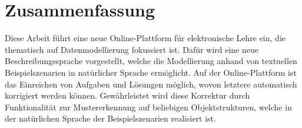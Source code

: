 \chapter*{Zusammenfassung}


Diese Arbeit führt eine neue Online-Plattform für elektronische Lehre ein, die thematisch auf Datenmodellierung fokussiert ist.
Dafür wird eine neue Beschreibungssprache vorgestellt, welche die Modellierung anhand von textuellen Beispielszenarien in natürlicher Sprache ermöglicht.
Auf der Online-Plattform ist das Einreichen von Aufgaben und Lösungen möglich, wovon letztere automatisch korrigiert werden können.
Gewährleistet wird diese Korrektur durch Funktionalität zur Mustererkennung auf beliebigen Objektstrukturen, welche in der natürlichen Sprache der Beispielszenarien realisiert ist.
